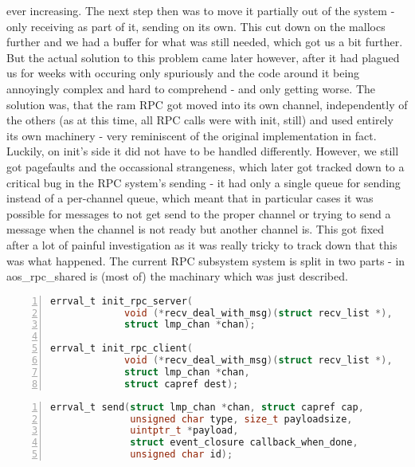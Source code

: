 ever increasing.
The next step then was to move it partially out of the system - only 
receiving as part of it, sending on its own. This cut down on the mallocs 
further and we had a buffer for what was still needed, which got us a bit 
further. But the actual solution to this problem came later however, after it 
had plagued us for weeks with occuring only spuriously and the code around it 
being annoyingly complex and hard to comprehend - and only getting worse.
The solution was, that the ram RPC got moved into its own channel, 
independently of the others (as at this time, all RPC calls were with init, 
still) and used entirely its own machinery - very reminiscent of the original 
implementation in fact. Luckily, on init's side it did not have to be handled 
differently.
However, we still got pagefaults and the occassional strangeness, which 
later got tracked down to a critical bug in the RPC system's sending - it had 
only a single queue for sending instead of a per-channel queue, which meant 
that in particular cases it was possible for messages to not get send to the 
proper channel or trying to send a message when the channel is not ready but 
another channel is. This got fixed after a lot of painful investigation as it 
was really tricky to track down that this was what happened.
The current RPC subsystem system is split in two parts - in 
aos\_rpc\_shared is (most of) the machinary which was just described.
\medskip

\begin{lstlisting}[caption={RPC system inits}, 
label=lst:rpc_calls_1, numbers=left, stepnumber=1, float, floatplacement=tl, 
frame=tb, language=c]
errval_t init_rpc_server(
             void (*recv_deal_with_msg)(struct recv_list *),
             struct lmp_chan *chan);

errval_t init_rpc_client(
             void (*recv_deal_with_msg)(struct recv_list *),
             struct lmp_chan *chan, 
             struct capref dest);
\end{lstlisting}
\begin{lstlisting}[caption={RPC send}, 
label=lst:rpc_calls_2, numbers=left, stepnumber=1, float, floatplacement=tl, 
frame=tb, language=c]
errval_t send(struct lmp_chan *chan, struct capref cap, 
              unsigned char type, size_t payloadsize, 
              uintptr_t *payload, 
              struct event_closure callback_when_done, 
              unsigned char id);
\end{lstlisting}

